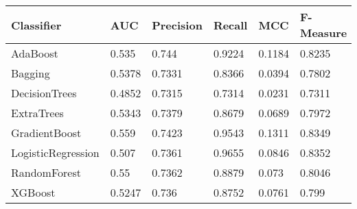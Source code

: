\begin{tabular}{|p{3cm}p{1.2cm}p{1.2cm}p{1.2cm}p{1.2cm}p{1.5cm}|}
  \hline
Classifier & AUC & Precision & Recall & MCC & F-Measure \\ 
  \hline \hline
AdaBoost & 0.535 & 0.744 & 0.9224 & 0.1184 & 0.8235 \\ 
  Bagging & 0.5378 & 0.7331 & 0.8366 & 0.0394 & 0.7802 \\ 
  DecisionTrees & 0.4852 & 0.7315 & 0.7314 & 0.0231 & 0.7311 \\ 
  ExtraTrees & 0.5343 & 0.7379 & 0.8679 & 0.0689 & 0.7972 \\ 
  GradientBoost & 0.559 & 0.7423 & 0.9543 & 0.1311 & 0.8349 \\ 
  LogisticRegression & 0.507 & 0.7361 & 0.9655 & 0.0846 & 0.8352 \\ 
  RandomForest & 0.55 & 0.7362 & 0.8879 & 0.073 & 0.8046 \\ 
  XGBoost & 0.5247 & 0.736 & 0.8752 & 0.0761 & 0.799 \\ 
   \hline
\end{tabular}
